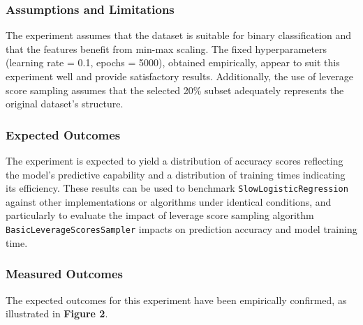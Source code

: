 \documentclass{article}
\theoremstyle{plain}
\theoremstyle{definition}
\theoremstyle{remark}
\begin{document}
\subsubsection{Assumptions and Limitations}

The experiment assumes that the dataset is suitable for binary classification and that the features benefit from min-max scaling. The fixed hyperparameters (learning rate = 0.1, epochs = 5000), obtained empirically, appear to suit this experiment well and provide satisfactory results. Additionally, the use of leverage score sampling assumes that the selected 20\% subset adequately represents the original dataset's structure.

\subsubsection{Expected Outcomes}

The experiment is expected to yield a distribution of accuracy scores reflecting the model's predictive capability and a distribution of training times indicating its efficiency. These results can be used to benchmark \texttt{SlowLogisticRegression} against other implementations or algorithms under identical conditions, and particularly to evaluate the impact of leverage score sampling algorithm \texttt{BasicLeverageScoresSampler} impacts on prediction accuracy and model training time.

\subsubsection{Measured Outcomes}

The expected outcomes for this experiment have been empirically confirmed, as illustrated in \textbf{Figure 2}.
\end{document}
